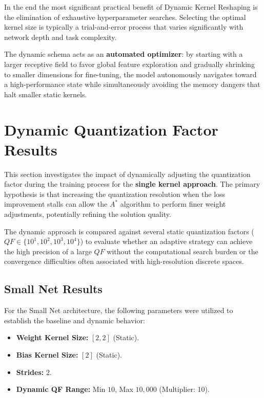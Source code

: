 In the end the most significant practical benefit of Dynamic Kernel Reshaping is the elimination of exhaustive hyperparameter searches. Selecting the optimal kernel size is typically a trial-and-error process that varies significantly with network depth and task complexity. 

The dynamic schema acts as an \textbf{automated optimizer}: by starting with a larger receptive field to favor global feature exploration and gradually shrinking to smaller dimensions for fine-tuning, the model autonomously navigates toward a high-performance state while simultaneously avoiding the memory dangers that halt smaller static kernels.

\newpage


\section{Dynamic Quantization Factor Results}

This section investigates the impact of dynamically adjusting the quantization factor during the training process for the \textbf{single kernel approach}. The primary hypothesis is that increasing the quantization resolution when the loss improvement stalls can allow the $A^*$ algorithm to perform finer weight adjustments, potentially refining the solution quality.

The dynamic approach is compared against several static quantization factors ($QF \in \{10^1, 10^2, 10^3, 10^4\}$) to evaluate whether an adaptive strategy can achieve the high precision of a large $QF$ without the computational search burden or the convergence difficulties often associated with high-resolution discrete spaces.

\subsection{Small Net Results}

For the Small Net architecture, the following parameters were utilized to establish the baseline and dynamic behavior:

\begin{itemize}
    \item \textbf{Weight Kernel Size:} $[2,2]$ (Static).
    \item \textbf{Bias Kernel Size:} $[2]$ (Static).
    \item \textbf{Strides:} 2.
    \item \textbf{Dynamic QF Range:} Min $10$, Max $10,000$ (Multiplier: 10).
    
\end{itemize}

